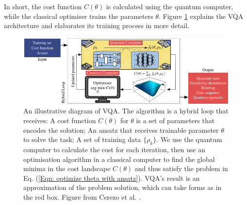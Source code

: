 In short, the cost function $C(\theta)$ is calculated using the quantum computer, while the classical optimiser trains the parameters $\theta$. Figure \ref{Fig: VQA diagram} explains the VQA architecture and elaborates its training process in more detail.

\begin{figure}
    \centering
    \includegraphics[width=\linewidth]{Appendices/vqadiagram.png}
    \caption{
        An illustrative diagram of VQA.
        The algorithm is a hybrid loop that receives:
        A cost function $C(\theta)$ for $\theta$ is a set of parameters that encodes the solution;
        An ansatz that receives trainable parameter $\theta$ to solve the task;
        A set of training data $\{\rho_k\}$.
        We use the quantum computer to calculate the cost for each iteration, then use an optimisation algorithm in a classical computer to find the global minima in the cost landscape $C(\theta)$ and thus satisfy the problem in Eq. (\ref{Eqn: optimize theta with ansatz}).
        VQA's result is an approximation of the problem solution, which can take forms as in the red box.
        Figure from Cerezo et al. \cite{cerezo2021variational}.
    }
    \label{Fig: VQA diagram}
\end{figure}







